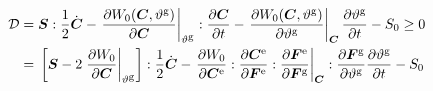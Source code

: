 \documentclass[10pt,letterpaper,oneside]{report}
\newcommand{\ten}[1]{\mbox{\boldmath $#1$}{}}
\newcommand{\scas}[1]{\mbox{{\scriptsize{${\rm{#1}}$}}}{}}
\newcommand{\tens}[1]{\mbox{\boldmath{\scriptsize{$#1$}}}{}}
\begin{document}
\begin{align}
\mathcal{D} ={}& \ten{S} : \frac{1}{2} \dot{\ten{C}} - \left. \frac{ \partial W_0 ( \ten{C}, \vartheta^{\scas{g}} ) }{\partial \ten{C}} \right|_{\vartheta^{\scas{g}}} : \frac{ \partial \ten{C} }{ \partial t } - \left. \frac{\partial W_0 ( \ten{C}, \vartheta^{\scas{g}} ) }{\partial \vartheta^{\scas{g}} } \right|_{\tens{C}} \frac{ \partial \vartheta^{\scas{g}} }{ \partial t } - S_0 \geq 0 
\\
={}& \left[ \ten{S} - 2 \left. \frac{\partial W_0 }{\partial \ten{C}} \right|_{\vartheta^{\scas{g}}} \right] : \frac{1}{2} \dot{\ten{C}} - \left. \frac{\partial W_0}{\partial \ten{C}^{\scas{e}}} : \frac{\partial \ten{C}^{\scas{e}}}{\partial \ten{F}^{\scas{e}}} : \frac{\partial \ten{F}^{\scas{e}}}{\partial \ten{F}^{\scas{g}}} \right|_{\tens{C}} : \frac{ \partial \ten{F}^{\scas{g}} }{ \partial \vartheta^{\scas{g}} } \frac{ \partial \vartheta^{\scas{g}} }{ \partial t } - S_0  
\notag \\

\end{align}
\end{document}
